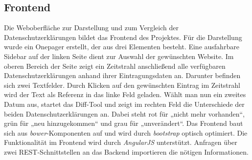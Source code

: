 \documentclass{article}
\begin{document}
	\subsection{Frontend}
	Die Weboberfläche zur Darstellung und zum Vergleich der Datenschutzerklärungen bildet das Frontend des Projektes. Für die Darstellung wurde ein Onepager erstellt, der aus drei Elementen besteht. Eine ausfahrbare Sidebar auf der linken Seite dient zur Auswahl der gewünschten Website.\newline
Im oberen Bereich der Seite zeigt ein Zeitstrahl anschließend alle verfügbaren Datenschutzerklärungen anhand ihrer Eintragungsdaten an. Darunter befinden sich zwei Textfelder.\newline
Durch Klicken auf den gewünschten Eintrag im Zeitstrahl wird der Text als Referenz in das linke Feld geladen. Wählt man nun ein zweites Datum aus, startet das Diff-Tool und zeigt im rechten Feld die Unterschiede der beiden Datenschutzerklärungen an. Dabei steht rot für „nicht mehr vorhanden“, grün für „neu hinzugekommen“ und grau für „unverändert“.
Das Frontend baut sich aus \textit{bower}-Komponenten auf und wird durch \textit{bootstrap} optisch optimiert. Die Funktionalität im Frontend wird durch \textit{AngularJS} unterstützt. Anfragen über zwei REST-Schnittstellen an das Backend importieren die nötigen Informationen.
\end{document}

